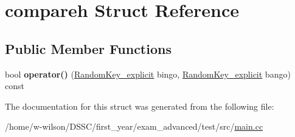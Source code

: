 \hypertarget{structcompareh}{}\section{compareh Struct Reference}
\label{structcompareh}
\subsection*{Public Member Functions}
\begin{DoxyCompactItemize}
\item 
\mbox{\label{structcompareh_ab0cdb778fd6b1b61fd6ed3ce186f4843}} 
bool {\bfseries operator()} (\hyperlink{struct_random_key__explicit}{Random\+Key\+\_\+explicit} bingo, \hyperlink{struct_random_key__explicit}{Random\+Key\+\_\+explicit} bango) const
\end{DoxyCompactItemize}


The documentation for this struct was generated from the following file\+:\begin{DoxyCompactItemize}
\item 
/home/w-\/wilson/\+D\+S\+S\+C/first\+\_\+year/exam\+\_\+advanced/test/src/\hyperlink{main_8cc}{main.\+cc}\end{DoxyCompactItemize}

